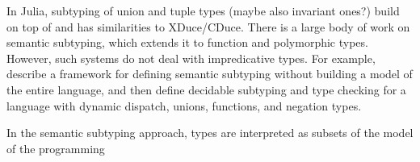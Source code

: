 In Julia, subtyping of union and tuple types (maybe also invariant ones?) build
on top of  and has similarities to XDuce/CDuce.
There is a large body of work on semantic subtyping, which extends it to
function and polymorphic types. However, such systems do not deal with
impredicative types.
For example, \citet{frih:sem-sub:2008} describe a framework for defining semantic
subtyping without building a model of the entire language, and then define
decidable subtyping and type checking for a language with dynamic dispatch,
unions, functions, and negation types.

In the semantic subtyping approach, types are interpreted as subsets of the
model of the programming

